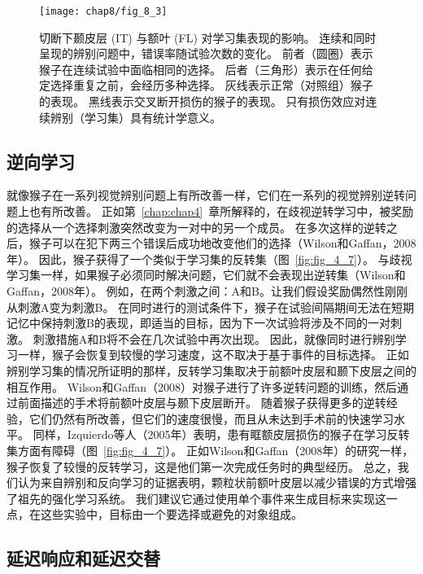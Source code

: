 \begin{figure} 
	\centering
	\texttt{[image: chap8/fig\_8\_3]}
	\caption{切断下颞皮层 (IT) 与额叶 (FL) 对学习集表现的影响。
		连续和同时呈现的辨别问题中，错误率随试验次数的变化。
		前者（圆圈）表示猴子在连续试验中面临相同的选择。
		后者（三角形）表示在任何给定选择重复之前，会经历多种选择。
		灰线表示正常（对照组）猴子的表现。
		黑线表示交叉断开损伤的猴子的表现。
		只有损伤效应对连续辨别（学习集）具有统计学意义\cite{browning2007frontal}。\label{fig:8_3}}
\end{figure}



\subsection{逆向学习}


就像猴子在一系列视觉辨别问题上有所改善一样，它们在一系列的视觉辨别逆转问题上也有所改善。
正如第~\ref{chap:chap4}~章所解释的，在歧视逆转学习中，被奖励的选择从一个选择刺激突然改变为一对中的另一个成员。
在多次这样的逆转之后，猴子可以在犯下两三个错误后成功地改变他们的选择（Wilson和Gaffan，2008年）。
因此，猴子获得了一个类似于学习集的反转集（图~\ref{fig:fig_4_7}）。
与歧视学习集一样，如果猴子必须同时解决问题，它们就不会表现出逆转集（Wilson和Gaffan，2008年）。
例如，在两个刺激之间：A和B。让我们假设奖励偶然性刚刚从刺激A变为刺激B。
在同时进行的测试条件下，猴子在试验间隔期间无法在短期记忆中保持刺激B的表现，即适当的目标，因为下一次试验将涉及不同的一对刺激。
刺激措施A和B将不会在几次试验中再次出现。
因此，就像同时进行辨别学习一样，猴子会恢复到较慢的学习速度，这不取决于基于事件的目标选择。
正如辨别学习集的情况所证明的那样，反转学习集取决于前额叶皮层和颞下皮层之间的相互作用。
Wilson和Gaffan（2008）对猴子进行了许多逆转问题的训练，然后通过前面描述的手术将前额叶皮层与颞下皮层断开。
随着猴子获得更多的逆转经验，它们仍然有所改善，但它们的速度很慢，而且从未达到手术前的快速学习水平。
同样，Izquierdo等人（2005年）表明，患有眶额皮层损伤的猴子在学习反转集方面有障碍（图~\ref{fig:fig_4_7}）。
正如Wilson和Gaffan（2008年）的研究一样，猴子恢复了较慢的反转学习，这是他们第一次完成任务时的典型经历。
总之，我们认为来自辨别和反向学习的证据表明，颗粒状前额叶皮层以减少错误的方式增强了祖先的强化学习系统。
我们建议它通过使用单个事件来生成目标来实现这一点，在这些实验中，目标由一个要选择或避免的对象组成。


\subsection{延迟响应和延迟交替}


